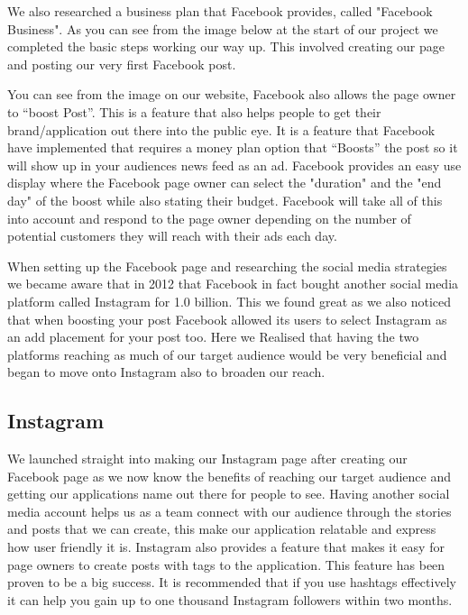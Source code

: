 We also researched a business plan that Facebook provides, called "Facebook Business". As you can see from the image below at the start of our project we completed the basic steps working our way up. This involved creating our page and posting our very first Facebook post. \hfill \break

You can see from the image on our website, Facebook also allows the page owner to “boost Post”. This is a feature that also helps people to get their brand/application out there into the public eye. It is a feature that Facebook have implemented that requires a money plan option that “Boosts” the post so it will show up in your audiences news feed as an ad.
Facebook provides an easy use display where the Facebook page owner can select the "duration" and the "end day" of the boost while also stating their budget. Facebook will take all of this into account and respond to the page owner depending on the number of potential customers they will reach with their ads each day.\hfill \break

When setting up the Facebook page and researching the social media strategies we became aware that in 2012 that Facebook in fact bought another social media platform called Instagram for 1.0 billion. This we found great as we also noticed that when boosting your post Facebook allowed its users to select Instagram as an add placement for your post too.
Here we Realised that having the two platforms reaching as much of our target audience would be very beneficial and began to move onto Instagram also to broaden our reach.


\subsection{Instagram}


We launched straight into making our Instagram page after creating our Facebook page as we now know the benefits of reaching our target audience and getting our applications name out there for people to see. Having another social media account helps us as a team connect with our audience through the stories and posts that we can create, this make our application relatable and express how user friendly it is.
Instagram also provides a feature that makes it easy for page owners to create posts with tags to the application. This feature has been proven to be a big success. It is recommended that if you use hashtags effectively it can help you gain up to one thousand Instagram followers within two months.\hfill \break

